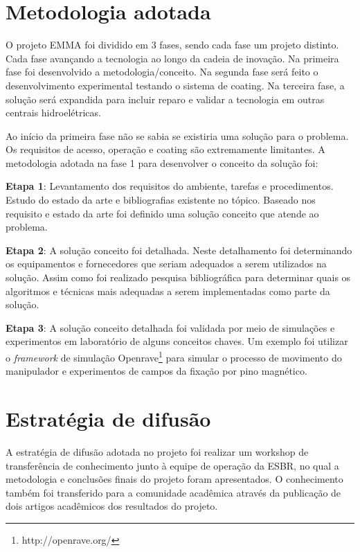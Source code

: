 \section{Metodologia adotada}

O projeto EMMA foi dividido em 3 fases, sendo cada fase um projeto distinto.
Cada fase avançando a tecnologia ao longo da cadeia de inovação. Na primeira
fase foi desenvolvido a metodologia/conceito. Na segunda fase será feito o
desenvolvimento experimental testando o sistema de coating. Na terceira fase, a
solução será expandida para incluir reparo e validar a tecnologia em
outras centrais hidroelétricas.

Ao início da primeira fase não se sabia se existiria uma solução para o
problema. Os requisitos de acesso, operação e coating são extremamente
limitantes. A metodologia adotada na fase 1 para desenvolver o conceito da
solução foi:

\textbf{Etapa 1}: Levantamento dos requisitos do ambiente, tarefas e
procedimentos.
Estudo do estado da arte e bibliografias existente no tópico. Baseado nos
requisito e estado da arte foi definido uma solução conceito que atende ao problema.

\textbf{Etapa 2}: A solução conceito foi detalhada. Neste detalhamento foi
determinando os equipamentos e fornecedores que seriam adequados a serem
utilizados na solução. Assim como foi realizado pesquisa bibliográfica para
determinar quais os algoritmos e técnicas mais adequadas a serem implementadas
como parte da solução.

\textbf{Etapa 3}:  A solução conceito detalhada foi validada por meio de
simulações e experi\-mentos em laboratório de alguns conceitos chaves. Um
exemplo foi utilizar o \textit{framework} de simulação
Openrave\footnote{http://openrave.org/} para simular o processo de movimento do manipulador e experimentos de campos da fixação por pino magnético.

\section{Estratégia de difusão}

A estratégia de difusão adotada no projeto foi realizar um workshop de
transferência de conhecimento junto à equipe de operação da ESBR, no qual a
metodologia e conclusões finais do projeto foram apresentados. O conhecimento
também foi transferido para a comunidade acadêmica através da publicação de
dois artigos acadêmicos dos resultados do projeto.

